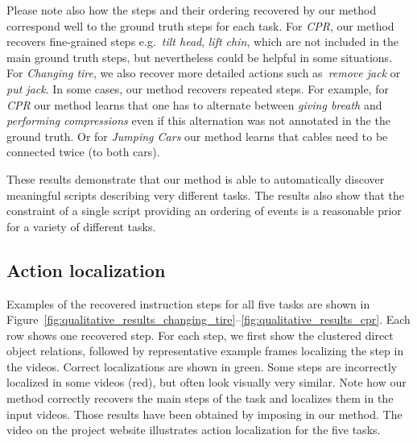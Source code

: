 \documentclass[10pt,twocolumn,letterpaper]{article}
\begin{document}
Please note also how the steps and their ordering recovered by our method correspond well to the ground truth steps for each task. 
        For {\em CPR}, our method recovers fine-grained steps e.g.~{\em tilt head}, {\em lift chin}, which are not included in the main ground truth steps, but nevertheless could be helpful in some situations.
	    For {\em Changing tire}, we also recover more detailed actions such as~{\em remove jack} or {\em put jack}.
In some cases, our method recovers repeated steps. For example, for {\em CPR} our method learns that one has to alternate between {\em giving breath} and {\em performing compressions} even if this alternation was not annotated in the the ground truth.
Or for  {\em Jumping Cars} our method learns that cables need to be connected twice (to both cars).


	    These results demonstrate that our method is able to automatically discover meaningful scripts describing very different tasks.
	    The results also show that the constraint of a single script providing an ordering of events is a reasonable prior for a variety of different tasks. 




\subsection{Action localization}
\label{subsec:action_loc}
Examples of the recovered instruction steps for all five tasks are shown in Figure~\ref{fig:qualitative_results_changing_tire}--\ref{fig:qualitative_results_cpr}.
Each row shows one recovered step. 
For each step, we first show the clustered direct object relations, followed by representative example frames localizing the step in the videos. Correct localizations are shown in green. Some steps are incorrectly localized in some videos (red), but often look visually very similar.  Note how our method correctly recovers the main steps of the task and localizes them in the input videos.
Those results have been obtained by imposing  in our method.
The video on the project website illustrates action localization for the five tasks.







\newpage

\setlength{\tabcolsep}{2pt}
\end{document}
